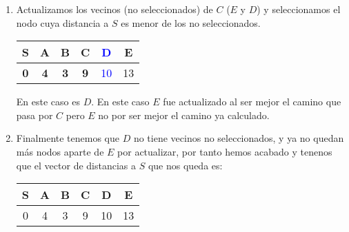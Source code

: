 \documentclass[12pt]{article}
\begin{document}
\begin{ejercicio}
\begin{enumerate}
            \item 
            Actualizamos los vecinos (no seleccionados) de $C$ ($E$ y $D$) 
            y seleccionamos el nodo 
            cuya distancia a $S$ es menor de los no seleccionados.
            \begin{center}
                \begin{tabular}{|c|c|c|c|c|c|}
                    \hline
                    \textbf{S}&\textbf{A}&\textbf{B}&
                    \textbf{C}&\textcolor{blue}{D}&E \\
                    \hline
                    \textbf{0}&\textbf{4}&\textbf{3}&
                    \textbf{9}&\textcolor{blue}{10}&13 \\
                    \hline
                \end{tabular}
            \end{center}
            En este caso es $D$. En este caso $E$ fue actualizado al 
            ser mejor el camino que pasa por $C$ pero $E$ 
            no por ser mejor el camino ya 
            calculado.
            \item Finalmente tenemos que $D$ no tiene vecinos no seleccionados,
            y ya no quedan más nodos aparte de $E$ por actualizar, por tanto hemos acabado
            y tenenos que el vector de distancias a $S$ que nos queda es:
            \begin{center}
                \begin{tabular}{|c|c|c|c|c|c|}
                    \hline
                    {S}&A&B&C&D&E \\
                    \hline
                    0&4&3&
                    9&10&13 \\
                    \hline
                \end{tabular}
            \end{center}
        \end{enumerate}
    \end{ejercicio}
\end{document}
